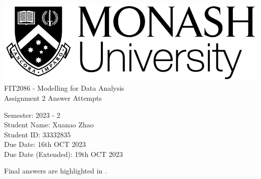 \begin{titlepage}

  \includegraphics[width=0.25\linewidth]{monashlogo.png} \\
  
  
  \pstitle
  FIT2086 - Modelling for Data Analysis \\
  Assignment 2 Answer Attempts

  \vspace{2cm}
  
  \pspara
  Semester: 2023 - 2 \\
  Student Name: Xuanao Zhao \\
  Student ID: 33332835 \\
  Due Date: 16th OCT 2023 \\
  Due Date (Extended): 19th OCT 2023

  \vspace{5cm}

  Final answers are highlighted in .

\end{titlepage}